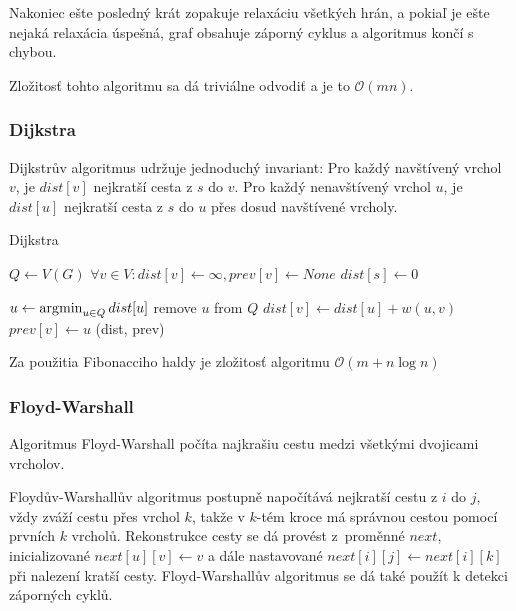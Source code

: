 Nakoniec ešte posledný krát zopakuje relaxáciu všetkých hrán,
a pokiaľ je ešte nejaká relaxácia úspešná, graf obsahuje 
záporný cyklus a algoritmus končí s chybou.

Zložitosť tohto algoritmu sa dá triviálne odvodiť a je to $\mathcal{O}(mn)$.

\subsubsection*{Dijkstra}
Dijkstrův algoritmus udržuje jednoduchý invariant:
Pro každý navštívený vrchol~$v$, je $dist[v]$ nejkratší cesta z $s$ do
$v$. Pro každý nenavštívený vrchol $u$, je $dist[u]$ nejkratší cesta z
$s$ do $u$ přes dosud navštívené vrcholy.

\begin{algorithm}[h]
\caption{Dijkstra}
\begin{algorithmic}[1]
    \State $Q \gets V(G)$
    \State $\forall v \in V : dist[v] \gets \infty, prev[v] \gets None$
    \State $dist[s] \gets 0$

        \State $u \gets \operatorname*{\arg\!\min}_{u \in Q} dist[u]$
        \State remove $u$ from $Q$
                \State $dist[v] \gets dist[u] + w(u,v) $
                \State $prev[v] \gets u$
            \EndIf
        \EndFor
    \EndWhile
    \State \Return (dist, prev)
\EndFunction
\end{algorithmic}
\end{algorithm}

Za použitia Fibonacciho haldy je zložitosť algoritmu $\mathcal{O}(m + n \log n)$

\subsubsection*{Floyd-Warshall}

Algoritmus Floyd-Warshall počíta najkrašiu cestu medzi všetkými
dvojicami vrcholov.

Floydův-Warshallův algoritmus postupně napočítává nejkratší cestu z $i$
do $j$, vždy zváží cestu přes vrchol $k$, takže v $k$-tém kroce
má správnou cestou pomocí prvních $k$ vrcholů.
Rekonstrukce cesty se dá provést z~proměnné $next$, inicializované
$next[u][v] \gets v$ a dále nastavované $next[i][j] \gets next[i][k]$
při nalezení kratší cesty.
Floyd-Warshallův algoritmus se dá také použít k detekci záporných cyklů.

